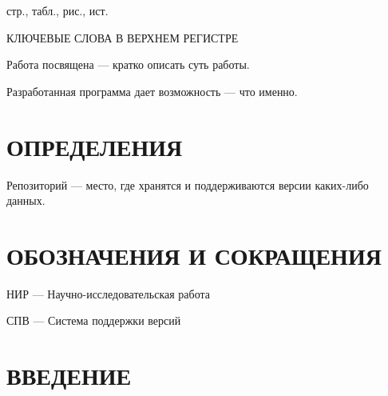 \documentclass[a4paper,12pt]{article}
\newcounter{mycitecount}                                %
\begin{document}
\thispagestyle{empty} %

 стр.,  табл.,  рис., \totalmycitecounts ист. 

КЛЮЧЕВЫЕ СЛОВА В ВЕРХНЕМ РЕГИСТРЕ

Работа посвящена --- кратко описать суть работы.

Разработанная программа дает возможность --- что именно.

\pagebreak
\thispagestyle{empty}

\section*{\centering ОПРЕДЕЛЕНИЯ}
\thispagestyle{empty} %

Репозиторий --- место, где хранятся и поддерживаются версии каких-либо данных. 

\pagebreak
\setcounter{page}{2}
\section*{\centering ОБОЗНАЧЕНИЯ И СОКРАЩЕНИЯ}


НИР --- Научно-исследовательская работа

СПВ --- Система поддержки версий



\pagebreak



\tableofcontents

\pagebreak

\section*{\centering ВВЕДЕНИЕ}
\pagebreak

%
\pagebreak
\pagebreak
\pagebreak

\end{document}
